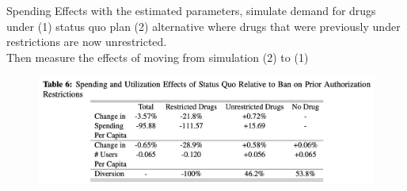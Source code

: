 \begin{frame}{Spending Effects}
    with the estimated parameters, simulate demand for drugs under (1) status quo plan (2) alternative where drugs that were previously under restrictions are now unrestricted. \\
    Then measure the effects of moving from simulation (2) to (1)
    \begin{figure}
        \centering
        \includegraphics[width=0.8\linewidth]{tb6-spending-effect.png}
    \end{figure}
\end{frame}